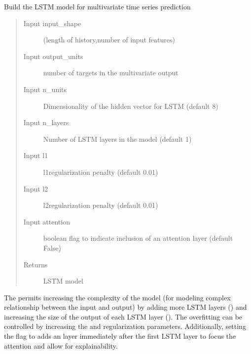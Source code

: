 \documentclass[letterpaper,10pt,english]{sphinxmanual}
\begin{document}
\begin{fulllineitems}
\label{\detokenize{manual:dnspredict.buildLSTMModel}}
Build the LSTM model for multivariate time series prediction
\begin{quote}\begin{description}
\item[{Input input\_shape}] \leavevmode
{} (length of history,number of input features)

\item[{Input output\_units}] \leavevmode
number of targets in the multivariate output

\item[{Input n\_units}] \leavevmode
Dimensionality of the hidden vector for LSTM (default 8)

\item[{Input n\_layers}] \leavevmode
Number of LSTM layers in the model (default 1)

\item[{Input l1}] \leavevmode
l1\sphinxhyphen{}regularization penalty (default 0.01)

\item[{Input l2}] \leavevmode
l2\sphinxhyphen{}regularization penalty (default 0.01)

\item[{Input attention}] \leavevmode
boolean flag to indicate inclusion of an attention layer (default False)

\item[{Returns}] \leavevmode
{} LSTM model

\end{description}\end{quote}

\end{fulllineitems}


The  permits increasing the complexity of the model (for modeling complex relationship between the input and output) by adding more LSTM layers () and increasing the size of the output of each LSTM layer (). The overfitting can be controlled by increasing the  and  regularization parameters. Additionally, setting the  flag to  adds an  layer immediately after the first LSTM layer to focus the attention and allow for explainability.
\end{document}
